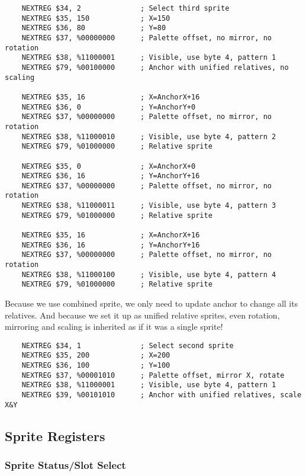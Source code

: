\begin{lstlisting}
    NEXTREG $34, 2              ; Select third sprite
    NEXTREG $35, 150            ; X=150
    NEXTREG $36, 80             ; Y=80
    NEXTREG $37, %00000000      ; Palette offset, no mirror, no rotation
    NEXTREG $38, %11000001      ; Visible, use byte 4, pattern 1
    NEXTREG $79, %00100000      ; Anchor with unified relatives, no scaling

    NEXTREG $35, 16             ; X=AnchorX+16
    NEXTREG $36, 0              ; Y=AnchorY+0
    NEXTREG $37, %00000000      ; Palette offset, no mirror, no rotation
    NEXTREG $38, %11000010      ; Visible, use byte 4, pattern 2
    NEXTREG $79, %01000000      ; Relative sprite

    NEXTREG $35, 0              ; X=AnchorX+0
    NEXTREG $36, 16             ; Y=AnchorY+16
    NEXTREG $37, %00000000      ; Palette offset, no mirror, no rotation
    NEXTREG $38, %11000011      ; Visible, use byte 4, pattern 3
    NEXTREG $79, %01000000      ; Relative sprite

    NEXTREG $35, 16             ; X=AnchorX+16
    NEXTREG $36, 16             ; Y=AnchorY+16
    NEXTREG $37, %00000000      ; Palette offset, no mirror, no rotation
    NEXTREG $38, %11000100      ; Visible, use byte 4, pattern 4
    NEXTREG $79, %01000000      ; Relative sprite
\end{lstlisting}

Because we use combined sprite, we only need to update anchor to change all its relatives. And because we set it up as unified relative sprites, even rotation, mirroring and scaling is inherited as if it was a single sprite!

\begin{lstlisting}
    NEXTREG $34, 1              ; Select second sprite
    NEXTREG $35, 200            ; X=200
    NEXTREG $36, 100            ; Y=100
    NEXTREG $37, %00001010      ; Palette offset, mirror X, rotate
    NEXTREG $38, %11000001      ; Visible, use byte 4, pattern 1
    NEXTREG $39, %00101010      ; Anchor with unified relatives, scale X&Y 
\end{lstlisting}


\pagebreak
\subsection{Sprite Registers}
\label{zx_next_sprite_registers}

\subsubsection{Sprite Status/Slot Select }

